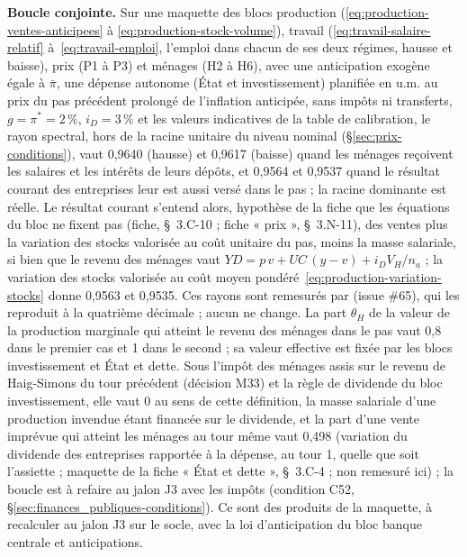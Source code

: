 \documentclass[11pt,a4paper]{article}
\newcommand{\code}[1]{\texttt{\detokenize{#1}}}
\begin{document}
\begin{proposee}
\textbf{Boucle conjointe.} Sur une maquette des blocs production (\eqref{eq:production-ventes-anticipees} à \eqref{eq:production-stock-volume}), travail (\eqref{eq:travail-salaire-relatif} à~\eqref{eq:travail-emploi}, l'emploi dans chacun de ses deux régimes, hausse et baisse), prix (P1 à P3) et ménages (H2 à H6), avec une anticipation exogène égale à $\bar\pi$, une dépense autonome (État et investissement) planifiée en u.m. au prix du pas précédent prolongé de l'inflation anticipée, sans impôts ni transferts, $g = \pi^\ast = 2\,\%$, $i_D = 3\,\%$ et les valeurs indicatives de la table de calibration, le rayon spectral, hors de la racine unitaire du niveau nominal (\S\ref{sec:prix-conditions}), vaut 0,9640 (hausse) et 0,9617 (baisse) quand les ménages reçoivent les salaires et les intérêts de leurs dépôts, et 0,9564 et 0,9537 quand le résultat courant des entreprises leur est aussi versé dans le pas ; la racine dominante est réelle. Le résultat courant s'entend alors, hypothèse de la fiche que les équations du bloc ne fixent pas (fiche, \S~3.C-10 ; fiche « prix », \S~3.N-11), des ventes plus la variation des stocks valorisée au coût unitaire du pas, moins la masse salariale, si bien que le revenu des ménages vaut $\mathit{YD} = p\,v + \mathit{UC}\,(y - v) + i_D V_H/n_a$ ; la variation des stocks valorisée au coût moyen pondéré~\eqref{eq:production-variation-stocks} donne 0,9563 et 0,9535. Ces rayons sont remesurés par \code{outils/maquette_conjointe.py} (issue \#65), qui les reproduit à la quatrième décimale ; aucun ne change. La part $\theta_H$ de la valeur de la production marginale qui atteint le revenu des ménages dans le pas vaut 0,8 dans le premier cas et 1 dans le second ; sa valeur effective est fixée par les blocs investissement et État et dette. Sous l'impôt des ménages assis sur le revenu de Haig-Simons du tour précédent (décision M33) et la règle de dividende du bloc investissement, elle vaut 0 au sens de cette définition, la masse salariale d'une production invendue étant financée sur le dividende, et la part d'une vente imprévue qui atteint les ménages au tour même vaut 0,498 (variation du dividende des entreprises rapportée à la dépense, au tour 1, quelle que soit l'assiette ; maquette de la fiche « État et dette », \S~3.C-4 ; non remesuré ici) ; la boucle est à refaire au jalon J3 avec les impôts (condition C52, \S\ref{sec:finances_publiques-conditions}). Ce sont des produits de la maquette, à recalculer au jalon J3 sur le socle, avec la loi d'anticipation du bloc banque centrale et anticipations.


\end{proposee}
\end{document}
